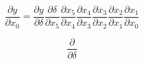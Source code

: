 \documentclass[a4paper,12pt]{article}
\begin{document}
$$
\frac{\partial y}{\partial x_0} = \frac{\partial y}{\partial \delta} \frac{\partial \delta}{\partial x_5} \frac{\partial x_5}{\partial x_4}
\frac{\partial x_4}{\partial x_3} \frac{\partial x_3}{\partial x_2} \frac{\partial x_2}{\partial x_1}
\frac{\partial x_1}{\partial x_0}
$$

$$
\frac{\partial}{\partial \delta}
$$
\end{document}

